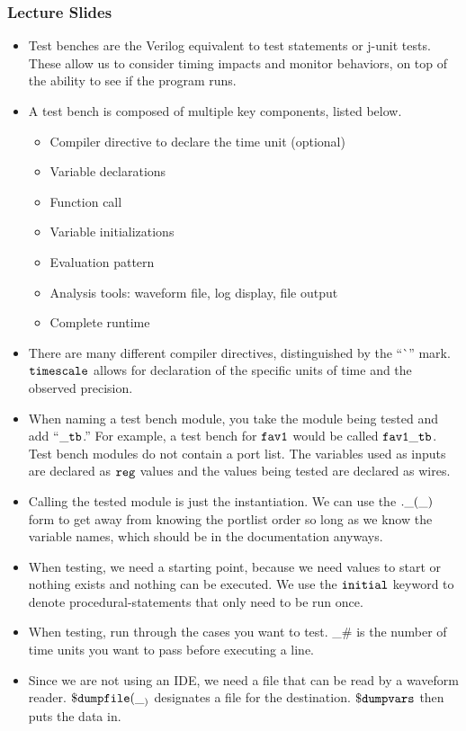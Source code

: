 \documentclass[10pt,a4paper]{article}
\begin{document}
\subsubsection{Lecture Slides}
\begin{itemize}
\item Test benches are the Verilog equivalent to test statements or j-unit tests. These allow us to consider timing impacts and monitor behaviors, on top of the ability to see if the program runs. 
\item A test bench is composed of multiple key components, listed below.
\begin{itemize}
\item Compiler directive to declare the time unit (optional)
\item Variable declarations
\item Function call
\item Variable initializations
\item Evaluation pattern
\item Analysis tools: waveform file, log display, file output
\item Complete runtime
\end{itemize}
\item There are many different compiler directives, distinguished by the ``\`{}'' mark. $\tt{timescale}$ allows for declaration of the specific units of time and the observed precision.
\item When naming a test bench module, you take the module being tested and add ``$\tt{\_tb}$.'' For example, a test bench for $\tt{fav1}$ would be called $\tt{fav1\_tb}$. Test bench modules do not contain a port list. The variables used as inputs are declared as $\tt{reg}$ values and the values being tested are declared as wires.
\item Calling the tested module is just the instantiation. We can use the $\tt{.\_(\_)}$ form to get away from knowing the portlist order so long as we know the variable names, which should be in the documentation anyways.
\item When testing, we need a starting point, because we need values to start or nothing exists and nothing can be executed. We use the $\tt{initial}$ keyword to denote procedural-statements that only need to be run once. 
\item When testing, run through the cases you want to test. \_\# is the number of time units you want to pass before executing a line. 
\item Since we are not using an IDE, we need a file that can be read by a waveform reader. $\tt{\$dumpfile(\__)}$ designates a file for the destination. $\tt{\$dumpvars}$ then puts the data in. 

\end{itemize}
\end{document}
